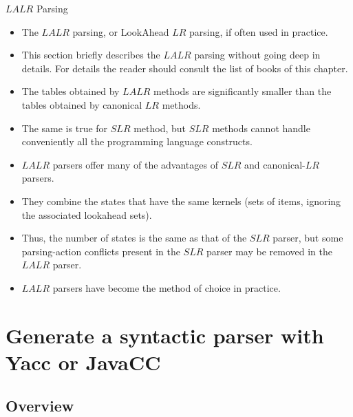 \begin{bibunit}[apalike]
\tableofcontentslide[sectionstyle={show/shaded},subsectionstyle={show/shaded/hide},subsubsectionstyle={show/shaded/hide/hide}]

\begin{frame}[allowframebreaks]{$LALR$ Parsing}
	\begin{itemize}
	\item The $LALR$ parsing, or LookAhead $LR$ parsing, if often used in practice.
	\item This section briefly describes the $LALR$ parsing without going deep in details. For details the reader should consult the list of books of this chapter.
	\item The tables obtained by $LALR$ methods are significantly smaller than the tables obtained by canonical $LR$ methods.
	\item The same is true for $SLR$ method, but $SLR$ methods cannot handle conveniently all the programming language constructs.
	\item $LALR$ parsers offer many of the advantages of $SLR$ and canonical-$LR$ parsers.
	\item They combine the states that have the same kernels (sets of items, ignoring the associated lookahead sets).
	\item Thus, the number of states is the same as that of the $SLR$ parser, but some parsing-action conflicts present in the $SLR$ parser may be removed in the $LALR$ parser.
	\item $LALR$ parsers have become the method of choice in practice.
	\end{itemize}
\end{frame}

\section[Parser Generators]{Generate a syntactic parser with Yacc or JavaCC}

\tableofcontentslide[sectionstyle={show/shaded},subsectionstyle={show/show/hide},subsubsectionstyle={hide/hide/hide/hide}]

\subsection{Overview}


\end{bibunit}
